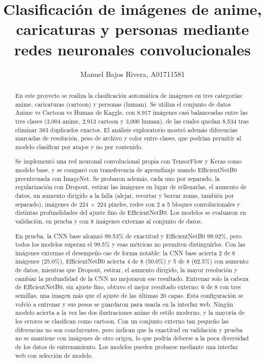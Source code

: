 \documentclass[letterpaper, 10 pt]{IEEEconf}
\title{\LARGE \bf
Clasificación de imágenes de anime, caricaturas y personas mediante redes neuronales convolucionales
}
\author{
Manuel Bajos Rivera, A01711581
}
\begin{document}
\maketitle
\thispagestyle{empty}
\pagestyle{empty}


\begin{abstract}

En este proyecto se realiza la clasificación automática de imágenes en tres categorías: anime, caricaturas (cartoon) y personas (human). Se utiliza el conjunto de datos Anime vs Cartoon vs Human de Kaggle, con 8,917 imágenes casi balanceadas entre las tres clases (3,004 anime, 2,913 cartoon y 3,000 human), de las cuales quedan 8,534 tras eliminar 383 duplicados exactos. El análisis exploratorio mostró además diferencias marcadas de resolución, peso de archivo y color entre clases, que podrían permitir al modelo clasificar por atajos y no por contenido.

Se implementó una red neuronal convolucional propia con TensorFlow y Keras como modelo base, y se comparó con transferencia de aprendizaje usando EfficientNetB0 preentrenada con ImageNet. Se probaron además, cada uno por separado, la regularización con Dropout, estirar las imágenes en lugar de rellenarlas, el aumento de datos, un aumento dirigido a la falla (alejar, recortar y borrar zonas, también por separado), imágenes de 224 $\times$ 224 píxeles, redes con 2 a 5 bloques convolucionales y distintas profundidades del ajuste fino de EfficientNetB0. Los modelos se evaluaron en validación, en prueba y con 8 imágenes externas al conjunto de datos.

En prueba, la CNN base alcanzó 99.53\% de exactitud y EfficientNetB0 99.92\%, pero todos los modelos superan el 99.5\% y esas métricas no permiten distinguirlos. Con las imágenes externas el desempeño cae de forma notable: la CNN base acierta 2 de 8 imágenes (25.0\%), EfficientNetB0 acierta 4 de 8 (50.0\%) y 5 de 8 (62.5\%) con aumento de datos, mientras que Dropout, estirar, el aumento dirigido, la mayor resolución y cambiar la profundidad de la CNN no mejoraron ese resultado. Entrenar solo la cabeza de EfficientNetB0, sin ajuste fino, obtuvo el mejor resultado externo: 6 de 8 con tres semillas, una imagen más que el ajuste de las últimas 20 capas. Esta configuración se volvió a entrenar y sus pesos se guardaron para usarla en la interfaz web. Ningún modelo acierta a la vez las dos ilustraciones anime de estilo moderno, y la mayoría de los errores se clasifican como cartoon. Con un conjunto externo tan pequeño las diferencias no son concluyentes, pero indican que la exactitud en validación y prueba no se mantiene con imágenes de otro origen, lo que podría deberse a la poca diversidad de los datos de entrenamiento. Los modelos pueden probarse mediante una interfaz web con selección de modelo.

\end{abstract}
\end{document}
